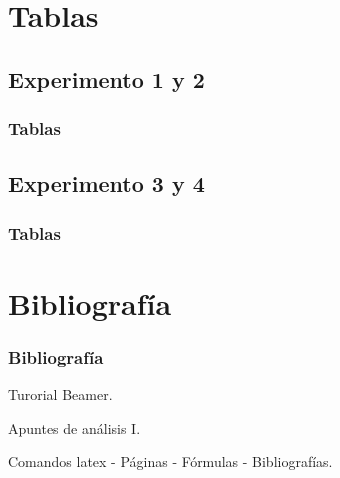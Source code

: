 \documentclass{beamer}
\begin{document}
\section{Tablas}

\subsection{Experimento 1 y 2}
\begin{frame}
\frametitle{Tablas}


\end{frame}

\subsection{Experimento 3 y 4}
\begin{frame}
\frametitle{Tablas}



\end{frame}
\section{Bibliografía}
\begin{frame}
  \frametitle{Bibliografía}

  \begin{thebibliography}{10}

    \beamertemplatebookbibitems
    Turorial Beamer. 

    \beamertemplatebookbibitems
    Apuntes de análisis I.
    
    \beamertemplatebookbibitems
    Comandos latex - Páginas - Fórmulas - Bibliografías. 

   

  \end{thebibliography}
\end{frame}

\end{document}
